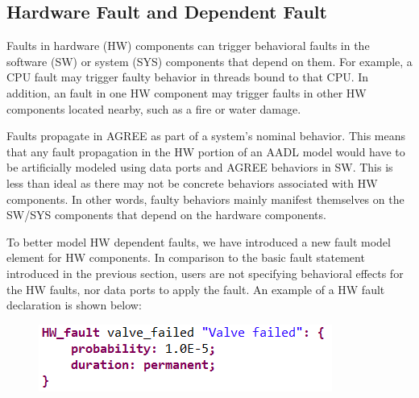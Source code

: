 \subsection{Hardware Fault and Dependent Fault}

Faults in hardware (HW) components can trigger behavioral faults in the software (SW) or system (SYS) components that depend on them.  For example, a CPU fault may trigger faulty behavior in threads bound to that CPU.  In addition, an fault in one HW component may trigger faults in other HW components located nearby, such as a fire or water damage. 

Faults propagate in AGREE as part of a system’s nominal behavior. This means that any fault propagation in the HW portion of an AADL model would have to be artificially modeled using data ports and AGREE behaviors in SW. This is less than ideal as there may not be concrete behaviors associated with HW components. In other words, faulty behaviors mainly manifest themselves on the SW/SYS components that depend on the hardware components. 

To better model HW dependent faults, we have introduced a new fault model element for HW components. In comparison to the basic fault statement introduced in the previous section, users are not specifying behavioral effects for the HW faults, nor data ports to apply the fault. An example of a HW fault declaration is shown below:
\begin{figure}[h!]
		\vspace{-0.2in}
	\begin{center}
		\includegraphics[width=.5\textwidth]{images/hw_fault.png}
	\end{center}
	\vspace{-0.4in}
\end{figure}

